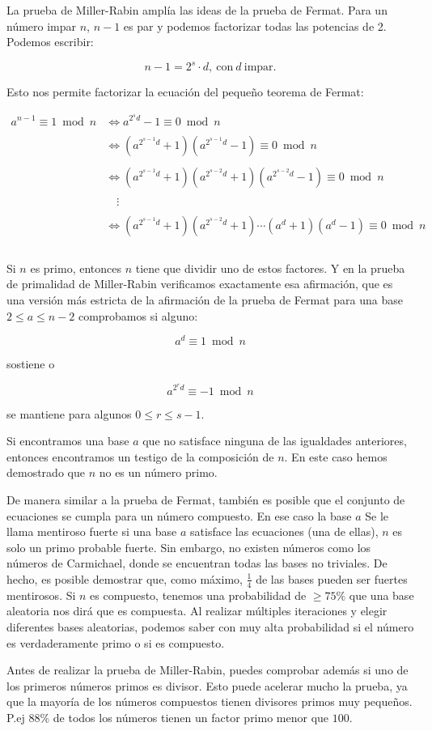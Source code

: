 La prueba de Miller-Rabin amplía las ideas de la prueba de Fermat. Para un número impar $n$, $n-1$ es par y podemos factorizar todas las potencias de 2. Podemos escribir:

$$n - 1 = 2^s \cdot d,~\text{con}~d~\text{impar}.$$

Esto nos permite factorizar la ecuación del pequeño teorema de Fermat:

$$
\begin{array}{rl}
	a^{n-1} \equiv 1 \bmod n &\Longleftrightarrow a^{2^s d} - 1 \equiv 0 \bmod n \\\\
	&\Longleftrightarrow (a^{2^{s-1} d} + 1) (a^{2^{s-1} d} - 1) \equiv 0 \bmod n \\\\
	&\Longleftrightarrow (a^{2^{s-1} d} + 1) (a^{2^{s-2} d} + 1) (a^{2^{s-2} d} - 1) \equiv 0 \bmod n \\\\
	&\quad\vdots \\\\
	&\Longleftrightarrow (a^{2^{s-1} d} + 1) (a^{2^{s-2} d} + 1) \cdots (a^{d} + 1) (a^{d} - 1) \equiv 0 \bmod n \\\\
\end{array}
$$

Si $n$ es primo, entonces $n$ tiene que dividir uno de estos factores. Y en la prueba de primalidad de Miller-Rabin verificamos exactamente esa afirmación, que es una versión más estricta de la afirmación de la prueba de Fermat para una base $2 \le a \le n-2$ comprobamos si alguno:

$$a^d \equiv 1 \bmod n$$

sostiene o

$$a^{2^r d} \equiv -1 \bmod n$$

se mantiene para algunos $0 \le r \le s-1$.

Si encontramos una base $a$ que no satisface ninguna de las igualdades anteriores, entonces encontramos un testigo de la composición de $n$. En este caso hemos demostrado que $n$ no es un número primo.

De manera similar a la prueba de Fermat, también es posible que el conjunto de ecuaciones se cumpla para un número compuesto. En ese caso la base $a$ Se le llama mentiroso fuerte si una base $a$ satisface las ecuaciones (una de ellas), $n$ es solo un primo probable fuerte. Sin embargo, no existen números como los números de Carmichael, donde se encuentran todas las bases no triviales. De hecho, es posible demostrar que, como máximo, $\frac{1}{4}$ de las bases pueden ser fuertes mentirosos. Si $n$ es compuesto, tenemos una probabilidad de $\ge 75\%$ que una base aleatoria nos dirá que es compuesta. Al realizar múltiples iteraciones y elegir diferentes bases aleatorias, podemos saber con muy alta probabilidad si el número es verdaderamente primo o si es compuesto.

Antes de realizar la prueba de Miller-Rabin, puedes comprobar además si uno de los primeros números primos es divisor. Esto puede acelerar mucho la prueba, ya que la mayoría de los números compuestos tienen divisores primos muy pequeños. P.ej $88\%$ de todos los números tienen un factor primo menor que $100$.